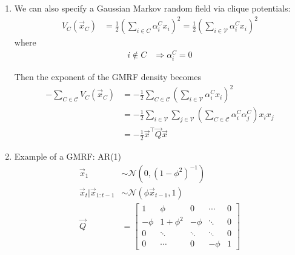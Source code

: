 \documentclass[12pt,twoside]{article}
\begin{document}
\begin{enumerate}
	\item We can also specify a Gaussian Markov random field via clique potentials:
		\begin{align*}
			V_C (\vec{x}_C) & = \frac{1}{2}\left(\sum_{i\in C} \alpha_i^C x_i\right)^2 = \frac{1}{2}\left(\sum_{i\in\mathcal{V}} \alpha_i^C x_i\right)^2			
		\end{align*}	
		where
		\begin{align*}
			i\notin C &\Rightarrow \alpha_i^C = 0
		\end{align*}				
	
		Then the exponent of the GMRF density becomes
		\begin{align*}
			-\sum_{C\in\mathcal{C}} V_C(\vec{x}_C) 
			& = -\frac{1}{2} \sum_{C\in\mathcal{C}} \left(\sum_{i\in\mathcal{V}} \alpha_i^C x_i\right)^2\\
			& = -\frac{1}{2} \sum_{i\in\mathcal{V}}\sum_{j\in\mathcal{V}} \left(\sum_{C\in \mathcal{C}} \alpha_i^C \alpha_j^C\right)x_ix_j\\
			& = -\frac{1}{2}\vec{x}^\top\vec{Q}\vec{x}
		\end{align*}
			
\item Example of a GMRF: AR(1)
	\begin{align*}
		\vec{x}_1 & \sim \mathcal{N}\left(0, (1-\phi^2)^{-1} \right) \\
		\vec{x}_t \vert \vec{x}_{1:t-1} &\sim\mathcal{N}\left(\phi \vec{x}_{t-1}, 1 \right) \\
		\vec{Q}		& = \begin{bmatrix}
		1				&			\phi			&		0			& \cdots	& 	0\\
		-\phi			&		1+\phi^2		&		-\phi		&	\ddots	&	0\\
		0				&		\ddots			&		\ddots	&	\ddots	& 	0\\
		0				&		\cdots			&		0			& -\phi		&	1
		\end{bmatrix}
	\end{align*}



\end{enumerate}
\end{document}
